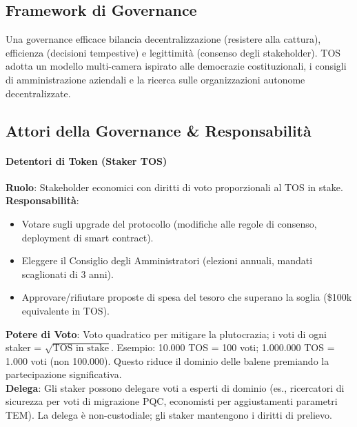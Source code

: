 \documentclass[11pt]{article}
\begin{document}
\begin{itemize}[noitemsep]
\section{Framework di Governance}
\label{sec:governance}

Una governance efficace bilancia decentralizzazione (resistere alla cattura), efficienza (decisioni tempestive) e legittimità (consenso degli stakeholder). TOS adotta un modello multi-camera ispirato alle democrazie costituzionali, i consigli di amministrazione aziendali e la ricerca sulle organizzazioni autonome decentralizzate.

\subsection{Attori della Governance \& Responsabilità}

\paragraph{Detentori di Token (Staker TOS)}
\textbf{Ruolo}: Stakeholder economici con diritti di voto proporzionali al TOS in stake.\\
\textbf{Responsabilità}:
\begin{itemize}[noitemsep]
  \item Votare sugli upgrade del protocollo (modifiche alle regole di consenso, deployment di smart contract).
  \item Eleggere il Consiglio degli Amministratori (elezioni annuali, mandati scaglionati di 3 anni).
  \item Approvare/rifiutare proposte di spesa del tesoro che superano la soglia (\$100k equivalente in TOS).
\end{itemize}
\textbf{Potere di Voto}: Voto quadratico per mitigare la plutocrazia; i voti di ogni staker = $\sqrt{\text{TOS in stake}}$. Esempio: 10.000 TOS = 100 voti; 1.000.000 TOS = 1.000 voti (non 100.000). Questo riduce il dominio delle balene premiando la partecipazione significativa.\\
\textbf{Delega}: Gli staker possono delegare voti a esperti di dominio (es., ricercatori di sicurezza per voti di migrazione PQC, economisti per aggiustamenti parametri TEM). La delega è non-custodiale; gli staker mantengono i diritti di prelievo.


\end{itemize}
\end{document}
